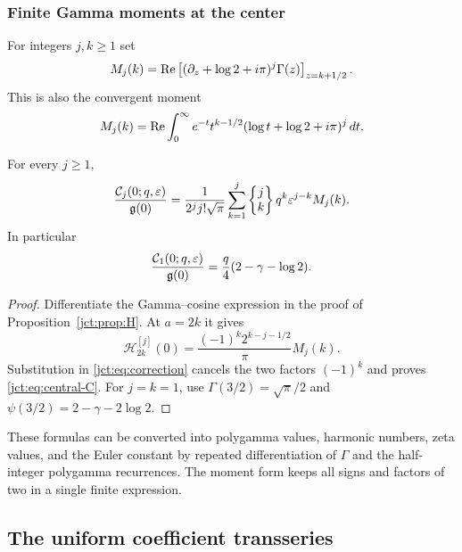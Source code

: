 \subsubsection{Finite Gamma moments at the center}

For integers $j,k\ge1$ set
\begin{equation}\label{jct:eq:M-jk}
 M_j(k)=\operatorname{Re}\left[
   (\partial_z+\log2+i\pi)^j\Gamma(z)
                      \right]_{z=k+1/2}.
\end{equation}
This is also the convergent moment
\begin{equation}\label{jct:eq:M-integral}
 M_j(k)=\operatorname{Re}\int_0^\infty e^{-t}t^{k-1/2}
                          (\log t+\log2+i\pi)^j\,dt.
\end{equation}

\begin{corollary}
\label{jct:cor:central-corrections}
For every $j\ge1$,
\begin{equation}\label{jct:eq:central-C}
 \frac{\mathcal C_j(0;q,\varepsilon)}{\mathfrak{g}(0)}
 =\frac1{2^j j!\sqrt\pi}
     \sum_{k=1}^j\left\{\begin{matrix}j\\k\end{matrix}\right\}q^k\varepsilon^{j-k}M_j(k).
\end{equation}
In particular
\begin{equation}\label{jct:eq:central-first}
 \frac{\mathcal C_1(0;q,\varepsilon)}{\mathfrak{g}(0)}
 =\frac q4(2-\gamma-\log2).
\end{equation}
\end{corollary}

\begin{proof}
Differentiate the Gamma--cosine expression in the proof of
Proposition~\ref{jct:prop:H}. At $a=2k$ it gives
\[
 \mathcal{H}_{2k}^{[j]}(0)=
       \frac{(-1)^k2^{k-j-1/2}}{\pi}M_j(k).
\]
Substitution in \eqref{jct:eq:correction} cancels the two factors
$(-1)^k$ and proves \eqref{jct:eq:central-C}. For $j=k=1$, use
$\Gamma(3/2)=\sqrt\pi/2$ and
$\psi(3/2)=2-\gamma-2\log2$.
\end{proof}

These formulas can be converted into polygamma values, harmonic numbers,
zeta values, and the Euler constant by repeated differentiation of
$\Gamma$ and the half-integer polygamma recurrences. The moment form
keeps all signs and factors of two in a single finite expression.

\subsection{The uniform coefficient transseries}
\label{jct:sec:main-proof}

